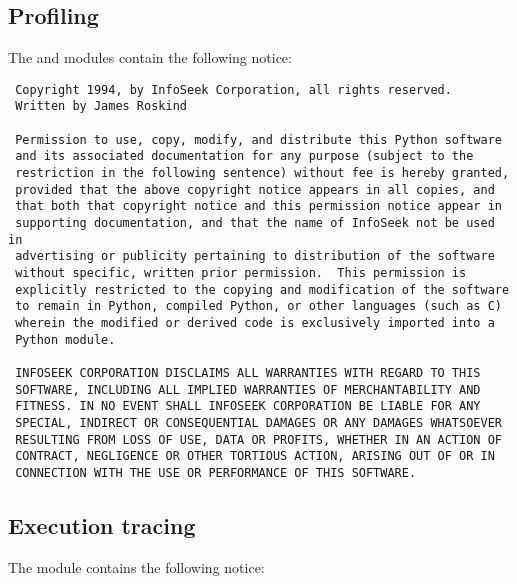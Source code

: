 \subsection{Profiling}

The  and  modules contain
the following notice:

\begin{verbatim}
 Copyright 1994, by InfoSeek Corporation, all rights reserved.
 Written by James Roskind

 Permission to use, copy, modify, and distribute this Python software
 and its associated documentation for any purpose (subject to the
 restriction in the following sentence) without fee is hereby granted,
 provided that the above copyright notice appears in all copies, and
 that both that copyright notice and this permission notice appear in
 supporting documentation, and that the name of InfoSeek not be used in
 advertising or publicity pertaining to distribution of the software
 without specific, written prior permission.  This permission is
 explicitly restricted to the copying and modification of the software
 to remain in Python, compiled Python, or other languages (such as C)
 wherein the modified or derived code is exclusively imported into a
 Python module.

 INFOSEEK CORPORATION DISCLAIMS ALL WARRANTIES WITH REGARD TO THIS
 SOFTWARE, INCLUDING ALL IMPLIED WARRANTIES OF MERCHANTABILITY AND
 FITNESS. IN NO EVENT SHALL INFOSEEK CORPORATION BE LIABLE FOR ANY
 SPECIAL, INDIRECT OR CONSEQUENTIAL DAMAGES OR ANY DAMAGES WHATSOEVER
 RESULTING FROM LOSS OF USE, DATA OR PROFITS, WHETHER IN AN ACTION OF
 CONTRACT, NEGLIGENCE OR OTHER TORTIOUS ACTION, ARISING OUT OF OR IN
 CONNECTION WITH THE USE OR PERFORMANCE OF THIS SOFTWARE.
\end{verbatim}



\subsection{Execution tracing}

The  module contains the following notice:

